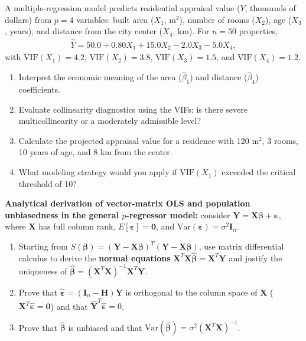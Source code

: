 \begin{problema}
\label{prob:1d085e7}
A multiple-regression model predicts residential appraisal value ($Y$, thousands of dollars) from $p=4$ variables: built area ($X_1$, m$^2$), number of rooms ($X_2$), age ($X_3$, years), and distance from the city center ($X_4$, km). For $n=50$ properties,
\begin{align}
\hat Y=50.0+0.80X_1+15.0X_2-2.0X_3-5.0X_4,
\end{align}
with $\text{VIF}(X_1)=4.2$, $\text{VIF}(X_2)=3.8$, $\text{VIF}(X_3)=1.5$, and $\text{VIF}(X_4)=1.2$.
\begin{enumerate}
\item Interpret the economic meaning of the area ($\hat\beta_1$) and distance ($\hat\beta_4$) coefficients.
\item Evaluate collinearity diagnostics using the VIFs: is there severe multicollinearity or a moderately admissible level?
\item Calculate the projected appraisal value for a residence with 120 m$^2$, 3 rooms, 10 years of age, and 8 km from the center.
\item What modeling strategy would you apply if $\text{VIF}(X_1)$ exceeded the critical threshold of 10?
\end{enumerate}
\end{problema}

\begin{problema}
\label{prob:15ced94}
\textbf{Analytical derivation of vector-matrix OLS and population unbiasedness in the general $p$-regressor model:} consider $\mathbf Y=\mathbf X\boldsymbol\beta+\boldsymbol\varepsilon$, where $\mathbf X$ has full column rank, $E[\boldsymbol\varepsilon]=\mathbf0$, and $\text{Var}(\boldsymbol\varepsilon)=\sigma^2\mathbf I_n$.
\begin{enumerate}
\item Starting from $S(\boldsymbol\beta)=(\mathbf Y-\mathbf X\boldsymbol\beta)^T(\mathbf Y-\mathbf X\boldsymbol\beta)$, use matrix differential calculus to derive the \textbf{normal equations} $\mathbf X^T\mathbf X\hat{\boldsymbol\beta}=\mathbf X^T\mathbf Y$ and justify the uniqueness of $\hat{\boldsymbol\beta}=(\mathbf X^T\mathbf X)^{-1}\mathbf X^T\mathbf Y$.
\item Prove that $\hat{\boldsymbol\varepsilon}=(\mathbf I_n-\mathbf H)\mathbf Y$ is orthogonal to the column space of $\mathbf X$ ($\mathbf X^T\hat{\boldsymbol\varepsilon}=\mathbf0$) and that $\hat{\mathbf Y}^T\hat{\boldsymbol\varepsilon}=0$.
\item Prove that $\hat{\boldsymbol\beta}$ is unbiased and that $\text{Var}(\hat{\boldsymbol\beta})=\sigma^2(\mathbf X^T\mathbf X)^{-1}$.
\end{enumerate}
\end{problema}

